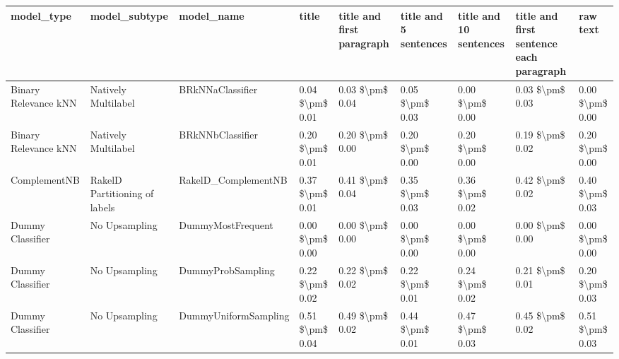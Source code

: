 \begin{tabular}{lllllllll}
\toprule
                     model\_type &                 model\_subtype &                                   model\_name &           title & title and first paragraph & title and 5 sentences & title and 10 sentences & title and first sentence each paragraph &            raw text \\
\midrule
           Binary Relevance kNN &           Natively Multilabel &                             BRkNNaClassifier & 0.04 \$\textbackslash pm\$ 0.01 &           0.03 \$\textbackslash pm\$ 0.04 &       0.05 \$\textbackslash pm\$ 0.03 &        0.00 \$\textbackslash pm\$ 0.00 &                         0.03 \$\textbackslash pm\$ 0.03 &     0.00 \$\textbackslash pm\$ 0.00 \\
           Binary Relevance kNN &           Natively Multilabel &                             BRkNNbClassifier & 0.20 \$\textbackslash pm\$ 0.01 &           0.20 \$\textbackslash pm\$ 0.00 &       0.20 \$\textbackslash pm\$ 0.00 &        0.20 \$\textbackslash pm\$ 0.00 &                         0.19 \$\textbackslash pm\$ 0.02 &     0.20 \$\textbackslash pm\$ 0.00 \\
                   ComplementNB & RakelD Partitioning of labels &                          RakelD\_ComplementNB & 0.37 \$\textbackslash pm\$ 0.01 &           0.41 \$\textbackslash pm\$ 0.04 &       0.35 \$\textbackslash pm\$ 0.03 &        0.36 \$\textbackslash pm\$ 0.02 &                         0.42 \$\textbackslash pm\$ 0.02 &     0.40 \$\textbackslash pm\$ 0.03 \\
               Dummy Classifier &                 No Upsampling &                            DummyMostFrequent & 0.00 \$\textbackslash pm\$ 0.00 &           0.00 \$\textbackslash pm\$ 0.00 &       0.00 \$\textbackslash pm\$ 0.00 &        0.00 \$\textbackslash pm\$ 0.00 &                         0.00 \$\textbackslash pm\$ 0.00 &     0.00 \$\textbackslash pm\$ 0.00 \\
               Dummy Classifier &                 No Upsampling &                            DummyProbSampling & 0.22 \$\textbackslash pm\$ 0.02 &           0.22 \$\textbackslash pm\$ 0.02 &       0.22 \$\textbackslash pm\$ 0.01 &        0.24 \$\textbackslash pm\$ 0.02 &                         0.21 \$\textbackslash pm\$ 0.01 &     0.20 \$\textbackslash pm\$ 0.03 \\
               Dummy Classifier &                 No Upsampling &                         DummyUniformSampling & 0.51 \$\textbackslash pm\$ 0.04 &           0.49 \$\textbackslash pm\$ 0.02 &       0.44 \$\textbackslash pm\$ 0.01 &        0.47 \$\textbackslash pm\$ 0.03 &                         0.45 \$\textbackslash pm\$ 0.02 &     0.51 \$\textbackslash pm\$ 0.03 \\

\end{tabular}
